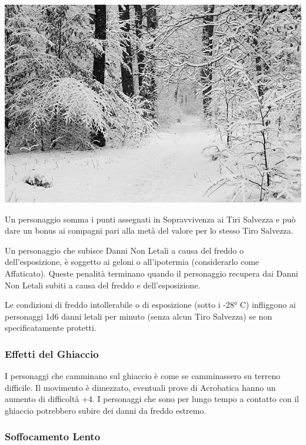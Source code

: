 \begin{multicols}{2}
\begin{center}
	\includegraphics[height=0.6\linewidth]{immagini/Forest_road_Slavne_2017_G4_grayscale.png}
\end{center}

Un personaggio somma i punti assegnati in Sopravvivenza ai Tiri Salvezza e può dare un bonus ai compagni pari alla metà del valore per lo stesso Tiro Salvezza.

Un personaggio che subisce Danni Non Letali a causa del freddo o dell'esposizione, è soggetto ai geloni o all'ipotermia (considerarlo come Affaticato). Queste penalità terminano quando il personaggio recupera dai Danni Non Letali subiti a causa del freddo e dell'esposizione.

Le condizioni di freddo intollerabile o di esposizione (sotto i -28° C) infliggono ai personaggi 1d6 danni letali per minuto (senza alcun Tiro Salvezza) se non specificatamente protetti.

\subsubsection{Effetti del Ghiaccio}

I personaggi che camminano sul ghiaccio è come se camminassero su terreno difficile. Il movimento è dimezzato, eventuali prove di Acrobatica hanno un aumento di difficoltà +4. I personaggi che sono per lungo tempo a contatto con il ghiaccio potrebbero subire dei danni da freddo estremo.

\subsubsection{Soffocamento Lento}


\end{multicols}
